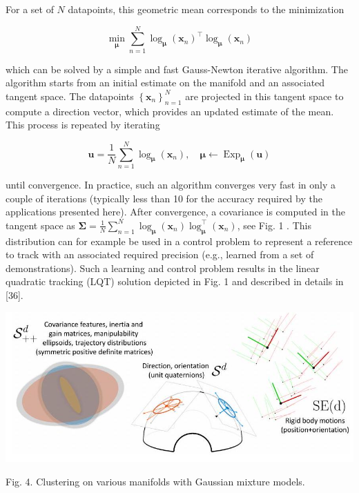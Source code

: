 \documentclass[10pt]{article}
\begin{document}
For a set of $N$ datapoints, this geometric mean corresponds to the minimization

$$
\min _{\boldsymbol{\mu}} \sum_{n=1}^{N} \log _{\boldsymbol{\mu}}\left(\boldsymbol{x}_{n}\right)^{\top} \log _{\boldsymbol{\mu}}\left(\boldsymbol{x}_{n}\right)
$$

which can be solved by a simple and fast Gauss-Newton iterative algorithm. The algorithm starts from an initial estimate on the manifold and an associated tangent space. The datapoints $\left\{\boldsymbol{x}_{n}\right\}_{n=1}^{N}$ are projected in this tangent space to compute a direction vector, which provides an updated estimate of the mean. This process is repeated by iterating

$$
\boldsymbol{u}=\frac{1}{N} \sum_{n=1}^{N} \log _{\boldsymbol{\mu}}\left(\boldsymbol{x}_{n}\right), \quad \boldsymbol{\mu} \leftarrow \operatorname{Exp}_{\boldsymbol{\mu}}(\boldsymbol{u})
$$

until convergence. In practice, such an algorithm converges very fast in only a couple of iterations (typically less than 10 for the accuracy required by the applications presented here). After convergence, a covariance is computed in the tangent space as $\boldsymbol{\Sigma}=\frac{1}{N} \sum_{n=1}^{N} \log _{\boldsymbol{\mu}}\left(\boldsymbol{x}_{n}\right) \log _{\boldsymbol{\mu}}^{\top}\left(\boldsymbol{x}_{n}\right)$, see Fig. 1 . This distribution can for example be used in a control problem to represent a reference to track with an associated required precision (e.g., learned from a set of demonstrations). Such a learning and control problem results in the linear quadratic tracking (LQT) solution depicted in Fig. 1 and described in details in [36].

\begin{center}
\includegraphics[max width=\textwidth]{2023_01_25_b4240e152b7ba97a594cg-05}
\end{center}

Fig. 4. Clustering on various manifolds with Gaussian mixture models.
\end{document}
